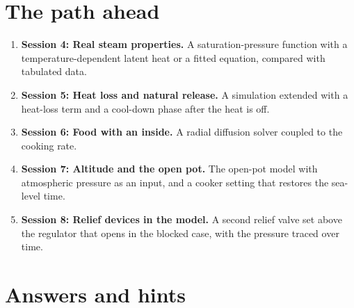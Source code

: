\documentclass[11pt,a4paper]{article}
\begin{document}
\section{The path ahead}
\begin{enumerate}[nosep]
\item \textbf{Session 4: Real steam properties.} A saturation-pressure function with a temperature-dependent latent heat or a fitted equation, compared with tabulated data.
\item \textbf{Session 5: Heat loss and natural release.} A simulation extended with a heat-loss term and a cool-down phase after the heat is off.
\item \textbf{Session 6: Food with an inside.} A radial diffusion solver coupled to the cooking rate.
\item \textbf{Session 7: Altitude and the open pot.} The open-pot model with atmospheric pressure as an input, and a cooker setting that restores the sea-level time.
\item \textbf{Session 8: Relief devices in the model.} A second relief valve set above the regulator that opens in the blocked case, with the pressure traced over time.
\end{enumerate}

\section{Answers and hints}
\end{document}

